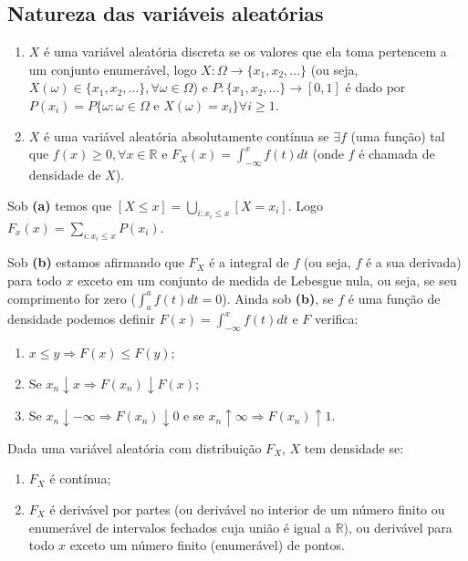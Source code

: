 \documentclass[
]{article}
\providecommand{\tightlist}{%
  \setlength{\itemsep}{0pt}\setlength{\parskip}{0pt}}
\theoremstyle{definition}
\theoremstyle{definition}
\theoremstyle{definition}
\theoremstyle{definition}
\theoremstyle{remark}
\begin{document}
\hypertarget{natureza-das-variuxe1veis-aleatuxf3rias}{%
\subsection{Natureza das variáveis aleatórias}\label{natureza-das-variuxe1veis-aleatuxf3rias}}

\begin{enumerate}
\def\labelenumi{\alph{enumi})}
\item
  \(X\) é uma variável aleatória discreta se os valores que ela toma pertencem a um conjunto enumerável, logo \(X:\Omega \to \{x_{1},x_{2},\ldots\}\) (ou seja, \(X(\omega) \in \{x_{1},x_{2},\ldots\}, \forall \omega \in \Omega\)) e \(P: \{x_{1},x_{2},\ldots\} \to [0,1]\) é dado por \(P(x_{i}) = P\{\omega : \omega \in \Omega \text{ e } X(\omega) = x_{i}\} \forall i \ge 1\).
\item
  \(X\) é uma variável aleatória absolutamente contínua se \(\exists f\) (uma função) tal que \(f(x) \ge 0, \forall x \in \mathbb{R}\) e \(F_{X}(x) = \int_{-\infty}^{x}f(t) dt\) (onde \(f\) é chamada de densidade de \(X\)).
\end{enumerate}

Sob \textbf{(a)} temos que \([X \le x] = \bigcup_{i : x_{i} \le x} [X = x_{i}]\). Logo \(F_{x}(x) = \sum_{i : x_{i} \le x}P(x_{i})\).

Sob \textbf{(b)} estamos afirmando que \(F_{X}\) é a integral de \(f\) (ou seja, \(f\) é a sua derivada) para todo \(x\) exceto em um conjunto de medida de Lebesgue nula, ou seja, se seu comprimento for zero (\(\int_{a}^{a}f(t) dt = 0\)). Ainda sob \textbf{(b)}, se \(f\) é uma função de densidade podemos definir \(F(x) = \int_{-\infty}^{x} f(t) dt\) e \(F\) verifica:

\begin{enumerate}
\def\labelenumi{\arabic{enumi}.}
\tightlist
\item
  \(x \le y \Rightarrow F(x) \le F(y)\);
\item
  Se \(x_{n} \downarrow x \Rightarrow F(x_{n}) \downarrow F(x)\);
\item
  Se \(x_{n} \downarrow -\infty \Rightarrow F(x_{n}) \downarrow 0\) e se \(x_{n}\uparrow \infty \Rightarrow F(x_{n}) \uparrow 1\).
\end{enumerate}

Dada uma variável aleatória com distribuição \(F_{X}\), \(X\) tem densidade se:

\begin{enumerate}
\def\labelenumi{(\roman{enumi})}
\tightlist
\item
  \(F_{X}\) é contínua;
\item
  \(F_{X}\) é derivável por partes (ou derivável no interior de um número finito ou enumerável de intervalos fechados cuja união é igual a \(\mathbb{R}\)), ou derivável para todo \(x\) exceto um número finito (enumerável) de pontos.
\end{enumerate}
\end{document}

